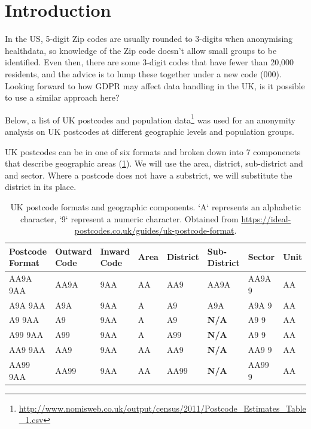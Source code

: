 \documentclass[12pt, a4paper]{article}
\title{\mytitle}
\author{\myauthor}
\date{\mydate}
\begin{document}
\maketitle

\section{Introduction}

In the US, 5-digit Zip codes are usually rounded to 3-digits when anonymising healthdata, so knowledge of the Zip code doesn’t allow small groups to be identified.  Even then, there are some 3-digit codes that have fewer than 20,000 residents, and the advice is to lump these together under a new code (000). Looking forward to how GDPR may affect data handling in the UK, is it possible to use a similar approach here?

Below, a list of UK postcodes and population data\footnote{\url{http://www.nomisweb.co.uk/output/census/2011/Postcode_Estimates_Table_1.csv}} was used for an anonymity analysis on UK postcodes at different geographic levels and population groups.

UK postcodes can be in one of six formats and broken down into 7 componenets that describe geographic areas (\cref{table:postcode_format}). We will use the area, district, sub-district and and sector. Where a postcode does not have a substrict, we will substitute the district in its place.

\begin{table}
\begin{center}
	\begin{tabular}{ m{}  m{}  m{}  m{}  m{}  m{}  m{}  m{}}
		Postcode Format & Outward Code & Inward Code & Area & District & Sub-District & Sector & Unit \\ \toprule
		AA9A 9AA & AA9A & 9AA & AA & AA9 & AA9A & AA9A 9 & AA \\
        A9A 9AA & A9A & 9AA & A & A9 & A9A & A9A 9 & AA \\
        A9 9AA & A9 & 9AA & A & A9 & \textbf{\textbf{N/A}} & A9 9 & AA \\
        A99 9AA & A99 & 9AA & A & A99 & \textbf{N/A} & A9 9 & AA \\
        AA9 9AA & AA9 & 9AA & AA & AA9 & \textbf{N/A} & AA9 9 & AA \\
        AA99 9AA & AA99 & 9AA  & AA & AA99 & \textbf{N/A} & AA99 9 & AA\\
	\end{tabular}
\end{center}
\caption{UK postcode formats and geographic components. `A` represents an alphabetic character, `9` represent a numeric character. Obtained from \url{https://ideal-postcodes.co.uk/guides/uk-postcode-format}.}\label{table:postcode_format}
\end{table}
\end{document}
